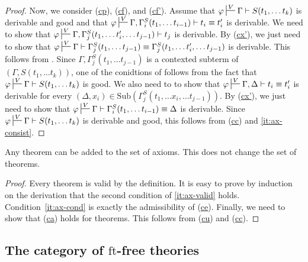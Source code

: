 \documentclass[reqno]{amsart}
\newcommand{\axref}[1]{(\hyperref[ax:#1]{#1})}
\theoremstyle{definition}
\theoremstyle{remark}
\newcommand{\fs}[1]{\mathrm{#1}}
\newcommand{\ft}{\fs{ft}}
\newcommand{\sub}{\fs{Sub}}
\numberwithin{figure}{section}
\begin{document}
\begin{proof}
Now, we consider \axref{cp}, \axref{cf}, and \axref{cf'}.
Assume that $\varphi \sststile{}{V} \Gamma \vdash S(t_1, \ldots t_k)$ is derivable and good and that $\varphi \sststile{}{V} \Gamma, \Gamma_i^S(t_1, \ldots t_{i-1}) \vdash t_i \equiv t_i'$ is derivable.
We need to show that $\varphi \sststile{}{V} \Gamma, \Gamma_j^S(t_1, \ldots t_i', \ldots t_{j-1}) \vdash t_j$ is derivable.
By \axref{cx'}, we just need to show that $\varphi \sststile{}{V} \Gamma \vdash \Gamma_j^S(t_1, \ldots t_{j-1}) \equiv \Gamma_j^S(t_1, \ldots t_i', \ldots t_{j-1})$ is derivable.
This follows from .
Since $\Gamma, \Gamma_j^S(t_1, \ldots t_{j-1})$ is a contexted subterm of $(\Gamma, S(t_1, \ldots t_k))$, one of the conidtions of  follows from the fact that $\varphi \sststile{}{V} \Gamma \vdash S(t_1, \ldots t_k)$ is good.
We also need to to show that $\varphi \sststile{}{V} \Gamma, \Delta \vdash t_i \equiv t_i'$ is derivable for every $(\Delta,x_i) \in \sub(\Gamma_j^S(t_1, \ldots x_i, \ldots t_{j-1}))$.
By \axref{cx'}, we just need to show that $\varphi \sststile{}{V} \Gamma \vdash \Gamma_i^S(t_1, \ldots t_{i-1}) \equiv \Delta$ is derivable.
Since $\varphi \sststile{}{V} \Gamma \vdash S(t_1, \ldots t_k)$ is derivable and good, this follows from \axref{cc} and \eqref{it:ax-consist}.
\end{proof}

\begin{cor}
Any theorem can be added to the set of axioms.
This does not change the set of theorems.
\end{cor}
\begin{proof}
Every theorem is valid by the definition.
It is easy to prove by induction on the derivation that the second condition of \eqref{it:ax-valid} holds.
Condition~\eqref{it:ax-cond} is exactly the admissibility of \axref{ce}.
Finally, we need to show that \axref{ca} holds for theorems.
This follows from \axref{cu} and \axref{cc}.
\end{proof}

\subsection{The category of $\ft$-free theories}
\label{sec:types}
\end{document}
